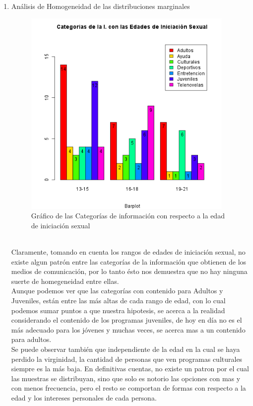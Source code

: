 \documentclass[letterpaper,spanish,11pt]{article}
\begin{document}
\begin{itemize}
\begin{enumerate}
\item An\'alisis de Homogeneidad de las distribuciones marginales\\
      \begin{figure}[htbp]
      	  \centering
  	  \includegraphics[width=4in,height=4in]{barplot_cat3}
	  \caption{Gr\'afico de las Categor\'ias de informaci\'on con respecto a la edad de iniciaci\'on sexual}
	  \label{fig:histograma1}
      \end{figure}\\
	Claramente, tomando en cuenta los rangos de edades de iniciaci\'on sexual, no existe algun patr\'on entre 
	las categor\'ias de la informaci\'on que obtienen de los medios de comunicaci\'on, por lo tanto \'esto nos 
	demuestra que no hay ninguna suerte de homegeneidad entre ellas.\\
	Aunque podemos ver que las categor\'ias con contenido para Adultos y Juveniles, est\'an entre las m\'as altas
	de cada rango de edad, con lo cual podemos sumar puntos a que nuestra hipotesis, se acerca a la realidad
	considerando el contenido de los programas juveniles, de hoy en d\'ia no es el m\'as adecuado para los 
	j\'ovenes  y muchas veces, se acerca mas a un contenido para adultos.\\
	Se puede observar tambi\'en que independiente de la edad en la cual se haya perdido la virginidad, la cantidad
	de personas que ven programas culturales siempre es la m\'as baja.
	En definitivas cuentas, no existe un patron por el cual las muestras se distribuyan, sino que solo es notorio
	las opciones con mas y con menos frecuencia, pero el resto se comportan de formas con respecto a la edad
	y los intereses personales de cada persona.



\end{enumerate}
\end{itemize}
\end{document}
